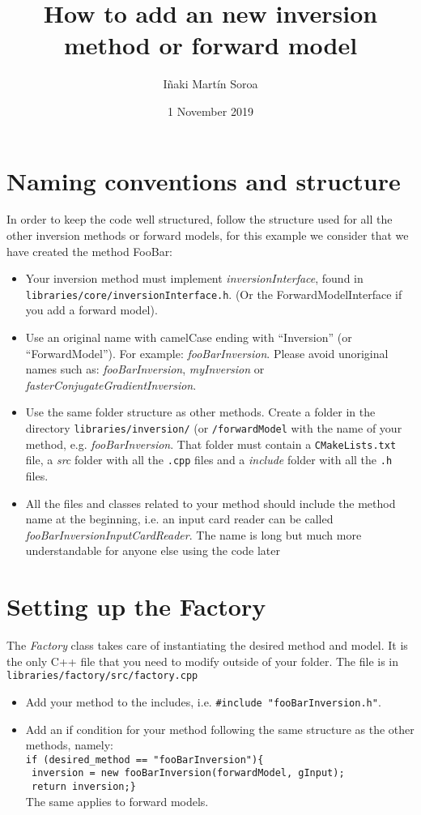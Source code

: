 \documentclass{article}
\title{How to add an new inversion method or forward model}
\author{I\~naki Mart\'in Soroa }
\date{1 November 2019}
\begin{document}
\maketitle

\section{Naming conventions and structure}
In order to keep the code well structured, follow the structure used for all the other inversion methods or forward models, for this example we consider that we have created the method FooBar:
\begin{itemize}
    \item Your inversion method must implement \textit{inversionInterface}, found in\\ \texttt{libraries/core/inversionInterface.h}. (Or the ForwardModelInterface if you add a forward model).
    \item Use an original name with camelCase ending with ``Inversion'' (or ``ForwardModel''). For example: \textit{fooBarInversion}. Please avoid unoriginal names such as: \textit{fooBarInversion}, \textit{myInversion} or \textit{fasterConjugateGradientInversion}.
    \item Use the same folder structure as other methods. Create a folder in the directory \texttt{libraries/inversion/} (or \texttt{/forwardModel} with the name of your method, e.g. \textit{fooBarInversion}. That folder must contain a \texttt{CMakeLists.txt} file, a \textit{src} folder with all the \texttt{.cpp} files and a \textit{include} folder with all the \texttt{.h} files.
    \item All the files and classes related to your method should include the method name at the beginning, i.e. an input card reader can be called \textit{fooBarInversionInputCardReader}. The name is long but much more understandable for anyone else using the code later
\end{itemize}

\section{Setting up the Factory}
The \textit{Factory} class takes care of instantiating the desired method and model. It is the only C++ file that you need to modify outside of your folder. The file is in\\ \texttt{libraries/factory/src/factory.cpp}
\begin{itemize}
    \item Add your method to the includes, i.e. \texttt{\#include "fooBarInversion.h"}.
    \item Add an if condition for your method following the same structure as the other methods, namely:\\\texttt{if (desired\_method == "fooBarInversion")\{}\\\texttt{    inversion = new fooBarInversion(forwardModel, gInput);}\\\texttt{    return inversion;\}}\\ The same applies to forward models.
\end{itemize}
\end{document}
